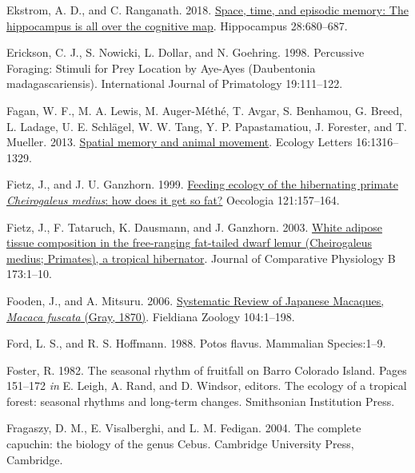 \documentclass[twoside,12pt,final]{ucthesis-CA2012}
\newenvironment{CSLReferences}%
  {}%
  {\par}
\begin{document}
\begin{ucmainmatter}
\begin{CSLReferences}{1}{0}
\leavevmode{}%
Ekstrom, A. D., and C. Ranganath. 2018. \href{https://doi.org/10.1002/hipo.22750}{Space, time, and episodic memory: The hippocampus is all over the cognitive map}. Hippocampus 28:680--687.

\leavevmode{}%
Erickson, C. J., S. Nowicki, L. Dollar, and N. Goehring. 1998. Percussive Foraging: Stimuli for Prey Location by Aye-Ayes (Daubentonia madagascariensis). International Journal of Primatology 19:111--122.

\leavevmode{}%
Fagan, W. F., M. A. Lewis, M. Auger-Méthé, T. Avgar, S. Benhamou, G. Breed, L. Ladage, U. E. Schlägel, W. W. Tang, Y. P. Papastamatiou, J. Forester, and T. Mueller. 2013. \href{https://doi.org/10.1111/ele.12165}{Spatial memory and animal movement}. Ecology Letters 16:1316--1329.

\leavevmode{}%
Fietz, J., and J. U. Ganzhorn. 1999. \href{https://doi.org/10.1007/s004420050917}{Feeding ecology of the hibernating primate \emph{Cheirogaleus medius}: how does it get so fat?} Oecologia 121:157--164.

\leavevmode{}%
Fietz, J., F. Tataruch, K. Dausmann, and J. Ganzhorn. 2003. \href{https://doi.org/10.1007/s00360-002-0300-1}{White adipose tissue composition in the free-ranging fat-tailed dwarf lemur (Cheirogaleus medius; Primates), a tropical hibernator}. Journal of Comparative Physiology B 173:1--10.

\leavevmode{}%
Fooden, J., and A. Mitsuru. 2006. \href{https://doi.org/10.3158/0015-0754(2005)104\%5B1:SROJMM\%5D2.0.CO;2}{Systematic Review of Japanese Macaques, \emph{Macaca fuscata} (Gray, 1870)}. Fieldiana Zoology 104:1--198.

\leavevmode{}%
Ford, L. S., and R. S. Hoffmann. 1988. Potos flavus. Mammalian Species:1--9.

\leavevmode{}%
Foster, R. 1982. The seasonal rhythm of fruitfall on Barro Colorado Island. Pages 151--172 \emph{in} E. Leigh, A. Rand, and D. Windsor, editors. The ecology of a tropical forest: seasonal rhythms and long-term changes. Smithsonian Institution Press.

\leavevmode{}%
Fragaszy, D. M., E. Visalberghi, and L. M. Fedigan. 2004. The complete capuchin: the biology of the genus Cebus. Cambridge University Press, Cambridge.


\end{CSLReferences}
\end{ucmainmatter}
\end{document}
